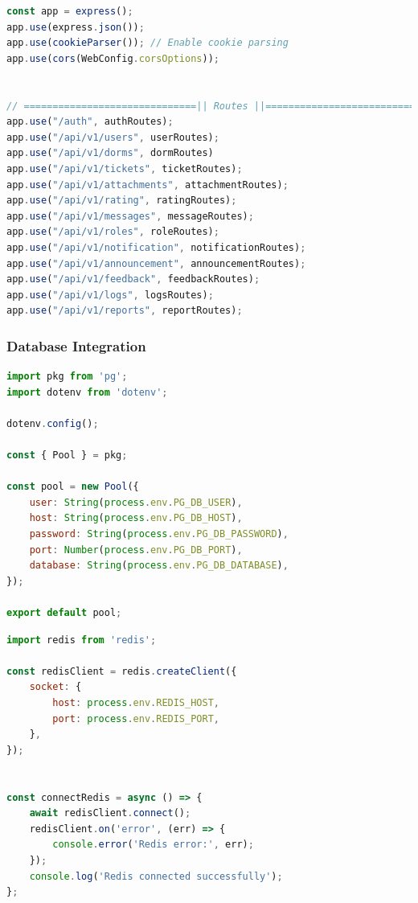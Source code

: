 \begin{lstlisting}[language=Javascript, breaklines=true, caption=ExpressJS Server Setup]
const app = express();
app.use(express.json());
app.use(cookieParser()); // Enable cookie parsing
app.use(cors(WebConfig.corsOptions));


// ==============================|| Routes ||============================== //
app.use("/auth", authRoutes);                     
app.use("/api/v1/users", userRoutes);                  
app.use("/api/v1/dorms", dormRoutes)
app.use("/api/v1/tickets", ticketRoutes);        
app.use("/api/v1/attachments", attachmentRoutes); 
app.use("/api/v1/rating", ratingRoutes);          
app.use("/api/v1/messages", messageRoutes);
app.use("/api/v1/roles", roleRoutes);       
app.use("/api/v1/notification", notificationRoutes); 
app.use("/api/v1/announcement", announcementRoutes);        
app.use("/api/v1/feedback", feedbackRoutes);       
app.use("/api/v1/logs", logsRoutes);     
app.use("/api/v1/reports", reportRoutes);
\end{lstlisting}	

	\subsubsection{Database Integration}
	
\begin{lstlisting}[language=Javascript, breaklines=true, caption=Server connects to PostgreSQL Database]
import pkg from 'pg';
import dotenv from 'dotenv';

dotenv.config();

const { Pool } = pkg;

const pool = new Pool({
	user: String(process.env.PG_DB_USER),
	host: String(process.env.PG_DB_HOST),
	password: String(process.env.PG_DB_PASSWORD),
	port: Number(process.env.PG_DB_PORT),
	database: String(process.env.PG_DB_DATABASE),
});

export default pool;  
\end{lstlisting}	


\begin{lstlisting}[language=Javascript, breaklines=true, caption=Server connects to Redis]
import redis from 'redis';

const redisClient = redis.createClient({
	socket: {
		host: process.env.REDIS_HOST,
		port: process.env.REDIS_PORT,
	},
});


const connectRedis = async () => {
	await redisClient.connect();
	redisClient.on('error', (err) => {
		console.error('Redis error:', err);
	});
	console.log('Redis connected successfully');
};
\end{lstlisting}	


